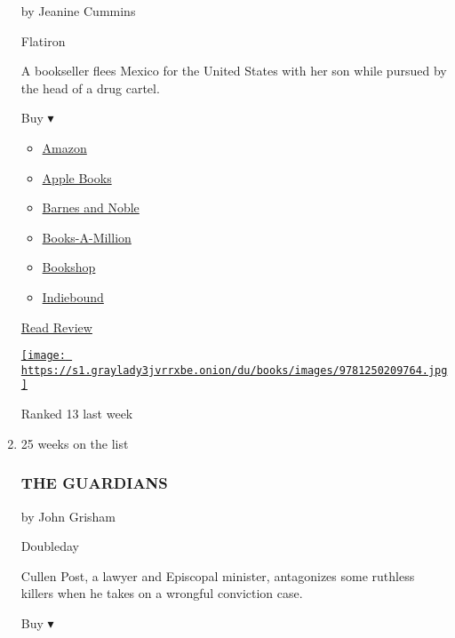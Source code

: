 \begin{enumerate}
  by Jeanine Cummins

  Flatiron

  A bookseller flees Mexico for the United States with her son while
  pursued by the head of a drug cartel.

  Buy ▾

  \begin{itemize}
  \tightlist
  \item
    \href{https://www.amazon.com/American-Dirt-Oprahs-Book-Club/dp/1250209765?tag=NYTBS-20}{Amazon}
  \item
    \href{https://du-gae-books-dot-nyt-du-prd.appspot.com/buy?title=AMERICAN+DIRT\&author=Jeanine+Cummins}{Apple
    Books}
  \item
    \href{https://www.anrdoezrs.net/click-7990613-11819508?url=https\%3A\%2F\%2Fwww.barnesandnoble.com\%2Fw\%2F\%3Fean\%3D9781250209764}{Barnes
    and Noble}
  \item
    \href{https://www.anrdoezrs.net/click-7990613-35140?url=https\%3A\%2F\%2Fwww.booksamillion.com\%2Fp\%2FAMERICAN\%2BDIRT\%2FJeanine\%2BCummins\%2F9781250209764}{Books-A-Million}
  \item
    \href{https://bookshop.org/a/3546/9781250209764}{Bookshop}
  \item
    \href{https://www.indiebound.org/book/9781250209764?aff=NYT}{Indiebound}
  \end{itemize}

  \href{https://www.nytimes3xbfgragh.onion/2020/01/17/books/review-american-dirt-jeanine-cummins.html}{Read
  Review}

  \href{https://www.nytimes3xbfgragh.onion/2020/01/17/books/review-american-dirt-jeanine-cummins.html}{\texttt{[image: https://s1.graylady3jvrrxbe.onion/du/books/images/9781250209764.jpg]}}

  Ranked 13 last week
\item
  25 weeks on the list

  \hypertarget{the-guardians}{%
  \subsubsection{THE GUARDIANS}\label{the-guardians}}

  by John Grisham

  Doubleday

  Cullen Post, a lawyer and Episcopal minister, antagonizes some
  ruthless killers when he takes on a wrongful conviction case.

  Buy ▾


\end{enumerate}

